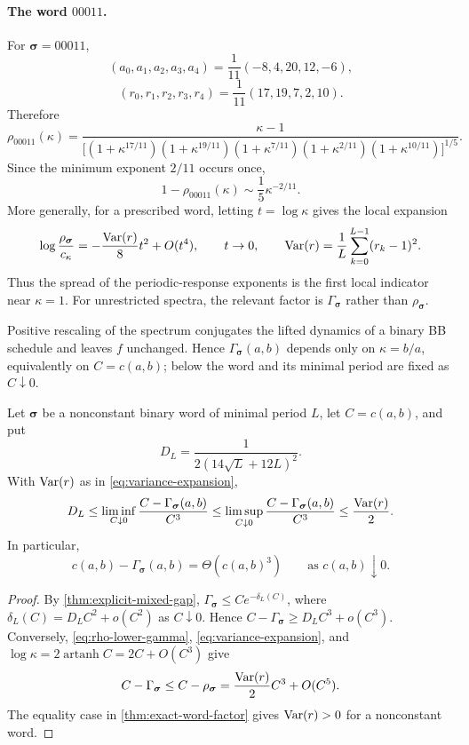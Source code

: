 \documentclass[letterpaper,twoside]{article}
\begin{document}
\paragraph{The word $00011$.}

For $\bm\sigma=00011$,
\[
 (a_0,a_1,a_2,a_3,a_4)
 =\frac1{11}(-8,4,20,12,-6),
\]
\[
 (r_0,r_1,r_2,r_3,r_4)
 =\frac1{11}(17,19,7,2,10).
\]
Therefore
\begin{equation}\label{eq:rho00011}
 \rho_{00011}(\kappa)
 =\frac{\kappa-1}{
 \bigl[(1+\kappa^{17/11})(1+\kappa^{19/11})
 (1+\kappa^{7/11})(1+\kappa^{2/11})
 (1+\kappa^{10/11})\bigr]^{1/5}}.
\end{equation}
Since the minimum exponent $2/11$ occurs once,
\begin{equation}\label{eq:rho00011-asymptotic}
 1-\rho_{00011}(\kappa)
 \sim\frac15\kappa^{-2/11}.
\end{equation}
More generally, for a prescribed word, letting $t=\log\kappa$ gives the local
expansion
\begin{equation}\label{eq:variance-expansion}
 \log\frac{\rho_{\bm\sigma}}{c_\kappa}
 =-\frac{\operatorname{Var}(r)}8t^2+O(t^4),\qquad t\to0,
 \qquad
 \operatorname{Var}(r)=\frac1L\sum_{k=0}^{L-1}(r_k-1)^2.
\end{equation}
Thus the spread of the periodic-response exponents is the first local
indicator near $\kappa=1$.  For unrestricted spectra, the relevant factor is
$\Gamma_{\bm\sigma}$ rather than $\rho_{\bm\sigma}$.

Positive rescaling of the spectrum conjugates the lifted dynamics of a binary
BB schedule and leaves $f$ unchanged.  Hence
$\Gamma_{\bm\sigma}(a,b)$ depends only on $\kappa=b/a$, equivalently on
$C=c(a,b)$; below the word and its minimal period are fixed as $C\downarrow0$.

\begin{corollary}
\label{cor:near-isotropic-full-gap}
Let $\bm\sigma$ be a nonconstant binary word of minimal period $L$, let
$C=c(a,b)$, and put
\[
 D_L=\frac{1}{2(14\sqrt L+12L)^2}.
\]
With $\operatorname{Var}(r)$ as in \eqref{eq:variance-expansion},
\[
 D_L
 \le \liminf_{C\downarrow0}
 \frac{C-\Gamma_{\bm\sigma}(a,b)}{C^3}
 \le \limsup_{C\downarrow0}
 \frac{C-\Gamma_{\bm\sigma}(a,b)}{C^3}
 \le \frac{\operatorname{Var}(r)}2.
\]
In particular,
\[
 c(a,b)-\Gamma_{\bm\sigma}(a,b)
 =\Theta\!\left(c(a,b)^3\right)
 \qquad\text{as }c(a,b)\downarrow0.
\]
\end{corollary}

\begin{proof}
By \cref{thm:explicit-mixed-gap},
$\Gamma_{\bm\sigma}\le C e^{-\delta_L(C)}$, where
$\delta_L(C)=D_LC^2+o(C^2)$ as $C\downarrow0$.  Hence
$C-\Gamma_{\bm\sigma}\ge D_LC^3+o(C^3)$.  Conversely,
\eqref{eq:rho-lower-gamma}, \eqref{eq:variance-expansion}, and
$\log\kappa=2\operatorname{artanh}C=2C+O(C^3)$ give
\[
 C-\Gamma_{\bm\sigma}
 \le C-\rho_{\bm\sigma}
 =\frac{\operatorname{Var}(r)}2C^3+O(C^5).
\]
The equality case in \cref{thm:exact-word-factor} gives $\operatorname{Var}(r)>0$ for a
nonconstant word.
\end{proof}
\end{document}
